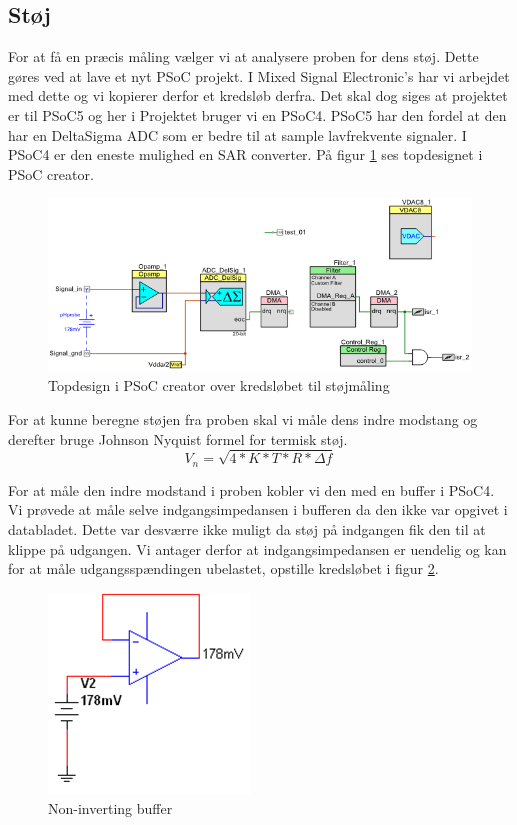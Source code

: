 \subsection{Støj}

For at få en præcis måling vælger vi at analysere proben for dens støj. Dette gøres ved at lave et nyt PSoC projekt. I Mixed Signal Electronic's har vi arbejdet med dette og vi kopierer derfor et kredsløb derfra. Det skal dog siges at projektet er til PSoC5 og her i Projektet bruger vi en PSoC4. PSoC5 har den fordel at den har en DeltaSigma ADC som er bedre til at sample lavfrekvente signaler. I PSoC4 er den eneste mulighed en SAR converter. På figur \ref{photo:Topdesign_stoj} ses topdesignet i PSoC creator. 
 \begin{figure}[H]
	\centering 
	\includegraphics[scale=0.8]{HardwareArkitektur/Sensore/pH_probe_billeder/Topdesign_stoj.png}
	\caption{Topdesign i PSoC creator over kredsløbet til støjmåling}
	\label{photo:Topdesign_stoj}
\end{figure} 

For at kunne beregne støjen fra proben skal vi måle dens indre modstang og derefter bruge Johnson Nyquist formel for termisk støj. 
$$ V_n = \sqrt{4*K*T*R*\Delta f} $$

For at måle den indre modstand i proben kobler vi den med en buffer i PSoC4. Vi prøvede at måle selve indgangsimpedansen i bufferen da den ikke var opgivet i databladet. Dette var desværre ikke muligt da støj på indgangen fik den til at klippe på udgangen. Vi antager derfor at indgangsimpedansen er uendelig og kan for at måle udgangsspændingen ubelastet, opstille kredsløbet i figur \ref{photo:Non_inv_buf}. 

 \begin{figure}[H]
	\centering 
	\includegraphics[scale=1]{HardwareArkitektur/Sensore/pH_probe_billeder/Non_inverting_buffer.png}
	\caption{Non-inverting buffer}
	\label{photo:Non_inv_buf}
\end{figure} 

